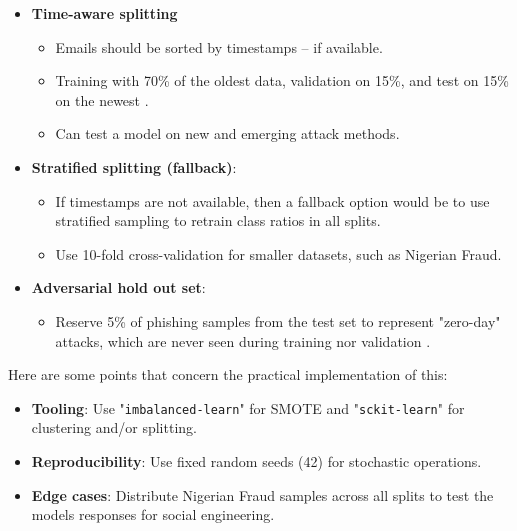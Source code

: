 \begin{itemize}
  \item \textbf{Time-aware splitting}
  \begin{itemize}
    \item Emails should be sorted by timestamps -- if available.
    \item Training with 70\% of the oldest data, validation on 15\%, and test on 15\% on the newest \citep{kapoor2024comparative}.
    \item Can test a model on new and emerging attack methods.
  \end{itemize}
  \item \textbf{Stratified splitting (fallback)}:
  \begin{itemize}
    \item If timestamps are not available, then a fallback option would be to use stratified sampling to retrain class ratios in all splits.
    \item Use 10-fold cross-validation for smaller datasets, such as Nigerian Fraud.
  \end{itemize}
  \item \textbf{Adversarial hold out set}:
  \begin{itemize}
    \item Reserve 5\% of phishing samples from the test set to represent "zero-day" attacks, which are never seen during training nor validation \citep{atlam2022business}.
  \end{itemize}
\end{itemize}

\noindent Here are some points that concern the practical implementation of this:

\begin{itemize}
  \item \textbf{Tooling}: Use "\texttt{imbalanced-learn}" for SMOTE and "\texttt{sckit-learn}" for clustering and/or splitting.
  \item \textbf{Reproducibility}: Use fixed random seeds (42) for stochastic operations.
  \item \textbf{Edge cases}: Distribute Nigerian Fraud samples across all splits to test the models responses for social engineering.
\end{itemize}
